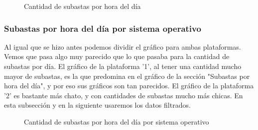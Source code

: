 \documentclass[a4paper, 12pt]{article}
\begin{document}
	\FloatBarrier
		\begin{figure}
			\centering
		   	\caption{Cantidad de subastas por hora del día}
			\label{subastashora}
		\end{figure}
	\FloatBarrier
	\subsubsection{Subastas por hora del día por sistema operativo}
	 Al igual que se hizo antes podemos dividir el gráfico para ambas plataformas. Vemos que pasa algo muy parecido que lo que pasaba para la cantidad de subastas por día. El gráfico de la plataforma '1', al tener una cantidad mucho mayor de subastas, es la que predomina en el gráfico de la sección "Subastas por hora del día", y por eso sus gráficos son tan parecidos. El gráfico de la plataforma '2' es bastante más chato, y con cantidades de subastas mucho más chicas.
	En esta subsección y en la siguiente usaremos los datos filtrados.
	\FloatBarrier
		\begin{figure}
			\centering
		   	\caption{Cantidad de subastas por hora del día por sistema operativo}
			\label{subastashoraSO}
		\end{figure}
	\FloatBarrier
\end{document}

